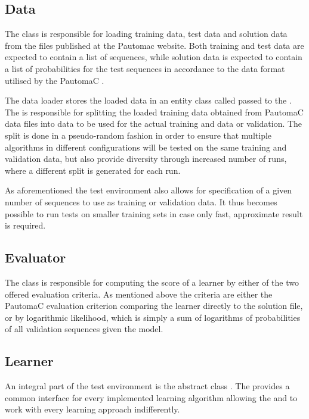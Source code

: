 \subsection{Data}
The  class is responsible for loading training data, test data and solution data from the files published at the Pautomac website. Both training and test data are expected to contain a list of sequences, while solution data is expected to contain a list of probabilities for the test sequences in accordance to the data format utilised by the PautomaC .

The data loader stores the loaded data in an entity class called  passed to the . The  is responsible for splitting the loaded training data obtained from PautomaC data files into data to be used for the actual training and data or validation. The split is done in a pseudo-random fashion in order to ensure that multiple algorithms in different configurations will be tested on the same training and validation data, but also provide diversity through increased number of runs, where a different split is generated for each run.

As aforementioned the test environment also allows for specification of a given number of sequences to use as training or validation data. It thus becomes possible to run tests on smaller training sets in case only fast, approximate result is required.

\subsection{Evaluator}
The  class is responsible for computing the score of a learner by either of the two offered evaluation criteria. As mentioned above the criteria are either the PautomaC evaluation criterion  comparing the learner directly to the solution file, or by logarithmic likelihood, which is simply a sum of logarithms of probabilities of all validation sequences given the model.

\subsection{Learner}
An integral part of the test environment is the abstract class . The  provides a common interface for every implemented learning algorithm allowing the  and  to work with every learning approach indifferently.

